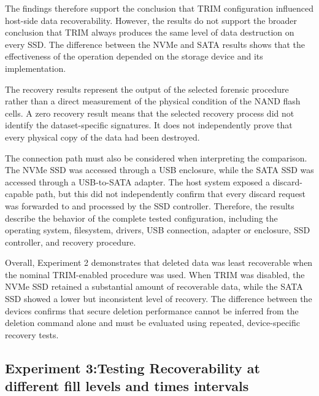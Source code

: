 The findings therefore support the conclusion that TRIM configuration influenced host-side data recoverability. However, the results do not support the broader 
conclusion that TRIM always produces the same level of data destruction on every SSD. The difference between the NVMe and SATA results shows that the effectiveness of 
the operation depended on the storage device and its implementation.

The recovery results represent the output of the selected forensic procedure rather than a direct measurement of the physical condition of the NAND flash cells. A zero 
recovery result means that the selected recovery process did not identify the dataset-specific signatures. It does not independently prove that every physical copy of 
the data had been destroyed. 

The connection path must also be considered when interpreting the comparison. The NVMe SSD was accessed through a USB enclosure, while the SATA SSD was accessed through 
a USB-to-SATA adapter. The host system exposed a discard-capable path, but this did not independently confirm that every discard request was forwarded to and processed 
by the SSD controller. Therefore, the results describe the behavior of the complete tested configuration, including the operating system, filesystem, drivers, USB 
connection, adapter or enclosure, SSD controller, and recovery procedure. 

Overall, Experiment 2 demonstrates that deleted data was least recoverable when the nominal TRIM-enabled procedure was used. When TRIM was disabled, the NVMe SSD 
retained a substantial amount of recoverable data, while the SATA SSD showed a lower but inconsistent level of recovery. The difference between the devices confirms 
that secure deletion performance cannot be inferred from the deletion command alone and must be evaluated using repeated, device-specific recovery tests.

\subsection{Experiment 3:Testing Recoverability at different fill levels and times intervals}

